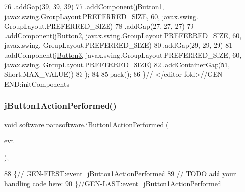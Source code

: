 \begin{DoxyCode}
76                 .addGap(39, 39, 39)
77                 .addComponent(\mbox{\hyperlink{classsoftware_1_1parasoftware_a38e0fa900147742a3d209603a3289f14}{jButton1}}, javax.swing.GroupLayout.PREFERRED\_SIZE, 60, javax.swing.
      GroupLayout.PREFERRED\_SIZE)
78                 .addGap(27, 27, 27)
79                 .addComponent(\mbox{\hyperlink{classsoftware_1_1parasoftware_a2d756706685fceab8e8cc24f7aece0bf}{jButton2}}, javax.swing.GroupLayout.PREFERRED\_SIZE, 60, javax.swing.
      GroupLayout.PREFERRED\_SIZE)
80                 .addGap(29, 29, 29)
81                 .addComponent(\mbox{\hyperlink{classsoftware_1_1parasoftware_a4e3c086e2257863c3de29e92e6f8f027}{jButton3}}, javax.swing.GroupLayout.PREFERRED\_SIZE, 60, javax.swing.
      GroupLayout.PREFERRED\_SIZE)
82                 .addContainerGap(51, Short.MAX\_VALUE))
83         );
84 
85         pack();
86     \}\textcolor{comment}{// </editor-fold>//GEN-END:initComponents}
\end{DoxyCode}
\mbox{\label{classsoftware_1_1parasoftware_a866edce40eadaed5d0c19446719b43e6}} 
\subsubsection{\texorpdfstring{j\+Button1\+Action\+Performed()}{jButton1ActionPerformed()}}
{\footnotesize\ttfamily void software.\+parasoftware.\+j\+Button1\+Action\+Performed (\begin{DoxyParamCaption}\item[{java.\+awt.\+event.\+Action\+Event}]{evt }\end{DoxyParamCaption})\hspace{0.3cm}{\ttfamily [inline]}, {\ttfamily [private]}}


\begin{DoxyCode}
88                                                                          \{\textcolor{comment}{//
      GEN-FIRST:event\_jButton1ActionPerformed}
89         \textcolor{comment}{// TODO add your handling code here:}
90     \}\textcolor{comment}{//GEN-LAST:event\_jButton1ActionPerformed}
\end{DoxyCode}
\mbox{\label{classsoftware_1_1parasoftware_a418767cd95088fa926d9d21e1ffb5a06}} 
